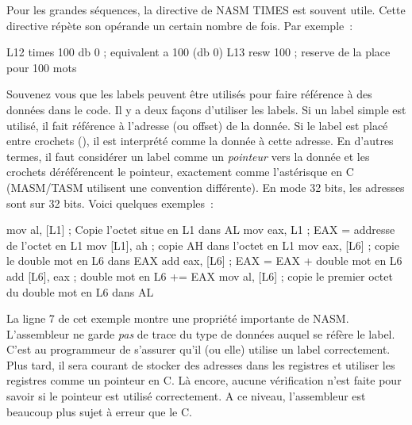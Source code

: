 Pour les grandes séquences, la directive de NASM {\code TIMES} 
est souvent utile. Cette directive répète son opérande un certain nombre
de fois. Par exemple~:
\begin{AsmCodeListing}[frame=none, numbers=none]
L12   times 100 db 0                 ; equivalent a 100 (db 0)
L13   resw   100                     ; reserve de la place pour 100 mots
\end{AsmCodeListing}

Souvenez vous que les labels peuvent être utilisés pour faire référence à des données
dans le code. Il y a deux façons d'utiliser les labels. Si un label simple
est utilisé, il fait référence à l'adresse (ou offset) de la donnée. Si le
label est placé entre crochets ({\code []}), il est interprété comme la donnée
à cette adresse. En d'autres termes, il faut considérer un label comme un
\emph{pointeur} vers la donnée et les crochets déréférencent le pointeur, exactement
comme l'astérisque en C (MASM/TASM utilisent une convention différente).
En mode 32 bits, les adresses sont sur 32 bits. Voici quelques exemples~:
\begin{AsmCodeListing}[frame=none]
      mov    al, [L1]      ; Copie l'octet situe en L1 dans AL
      mov    eax, L1       ; EAX = addresse de l'octet en L1
      mov    [L1], ah      ; copie AH dans l'octet en L1
      mov    eax, [L6]     ; copie le double mot en L6 dans EAX
      add    eax, [L6]     ; EAX = EAX + double mot en L6
      add    [L6], eax     ; double mot en L6 += EAX
      mov    al, [L6]      ; copie le premier octet du double mot en L6 dans AL
\end{AsmCodeListing}
La ligne 7 de cet exemple montre une propriété importante de NASM. L'assembleur
ne garde \emph{pas} de trace du type de données auquel se réfère le label.
C'est au programmeur de s'assurer qu'il (ou elle) utilise un label correctement.
Plus tard, il sera courant de stocker des adresses dans les registres et
utiliser les registres comme un pointeur en C. Là encore, aucune vérification n'est
faite pour savoir si le pointeur est utilisé correctement. A ce niveau,
l'assembleur est beaucoup plus sujet à erreur que le C.

